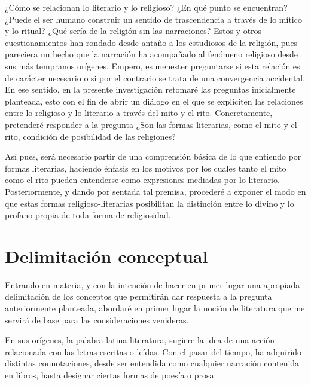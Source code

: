 \begin{refsection}

¿Cómo se relacionan lo literario y lo religioso? ¿En qué punto se encuentran? ¿Puede el ser humano construir un sentido de trascendencia a través de lo mítico y lo ritual? ¿Qué sería de la religión sin las narraciones? Estos y otros cuestionamientos han rondado desde antaño a los estudiosos de la religión, pues pareciera un hecho que la narración ha acompañado al fenómeno religioso desde sus más tempranos orígenes. Empero, es menester preguntarse si esta relación es de carácter necesario o si por el contrario se trata de una convergencia accidental. En ese sentido, en la presente investigación retomaré las preguntas inicialmente planteada, esto con el fin de abrir un diálogo en el que se expliciten las relaciones entre lo religioso y lo literario a través del mito y el rito. Concretamente, pretenderé responder a la pregunta ¿Son las formas literarias, como el mito y el rito, condición de posibilidad de las religiones?

Así pues, será necesario partir de una comprensión básica de lo que entiendo por formas literarias, haciendo énfasis en los motivos por los cuales tanto el mito como el rito pueden entenderse como expresiones mediadas por lo literario. Posteriormente, y dando por sentada tal premisa, procederé a exponer el modo en que estas formas religioso-literarias posibilitan la distinción entre lo divino y lo profano propia de toda forma de religiosidad.

\section{Delimitación conceptual}

Entrando en materia, y con la intención de hacer en primer lugar una apropiada delimitación de los conceptos que permitirán dar respuesta a la pregunta anteriormente planteada, abordaré en primer lugar la noción de literatura que me servirá de base para las consideraciones venideras.

En sus orígenes, la palabra latina literatura, sugiere la idea de una acción relacionada con las letras escritas o leídas. Con el pasar del tiempo, ha adquirido distintas connotaciones, desde ser entendida como cualquier narración contenida en libros, hasta designar ciertas formas de poesía o prosa.


\end{refsection}
